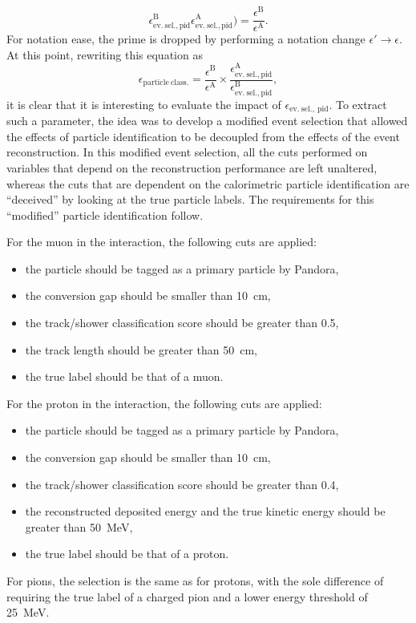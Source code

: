 \begin{equation}
{    \epsilon_\mathrm{ev.\ sel., pid}^\mathrm{B}
    }{
    \epsilon_\mathrm{ev.\ sel., pid}^\mathrm{A}
    }) = \frac{
    \epsilon^\mathrm{B}
    }{
    \epsilon^\mathrm{A}
    }. 
\end{equation} For notation ease, the prime is dropped by performing a notation change $\epsilon' \to \epsilon$. At this point, rewriting this equation as \begin{equation}
    \epsilon_\mathrm{particle\ class.} = \frac{
    \epsilon^\mathrm{B}
    }{
    \epsilon^\mathrm{A}
    } \times \frac{
    \epsilon_\mathrm{ev.\ sel., pid}^\mathrm{A}
    }{
    \epsilon_\mathrm{ev.\ sel., pid}^\mathrm{B}
    }, \label{eq:stageEfficiencyPostPID}
\end{equation} it is clear that it is interesting to evaluate the impact of $\epsilon_\mathrm{ev.\ sel.,\ pid}$. To extract such a parameter, the idea was to develop a modified event selection that allowed the effects of particle identification to be decoupled from the effects of the event reconstruction. In this modified event selection, all the cuts performed on variables that depend on the reconstruction performance are left unaltered, whereas the cuts that are dependent on the calorimetric particle identification are ``deceived'' by looking at the true particle labels. The requirements for this ``modified'' particle identification follow.  

\noindent
For the muon in the interaction, the following cuts are applied: \begin{itemize}
    \item the particle should be tagged as a primary particle by Pandora,
    \item the conversion gap should be smaller than \SI{10}{\cm},
    \item the track/shower classification score should be greater than 0.5,
    \item the track length should be greater than \SI{50}{\cm},
    \item the true label should be that of a muon. 
\end{itemize}
For the proton in the interaction, the following cuts are applied: \begin{itemize}
    \item the particle should be tagged as a primary particle by Pandora,
    \item the conversion gap should be smaller than \SI{10}{\cm},
    \item the track/shower classification score should be greater than 0.4,
    \item the reconstructed deposited energy and the true kinetic energy should be greater than \SI{50}{\MeV},
    \item the true label should be that of a proton.
\end{itemize}
For pions, the selection is the same as for protons, with the sole difference of requiring the true label of a charged pion and a lower energy threshold of \SI{25}{\MeV}. 

